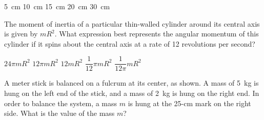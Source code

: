 \documentclass{../../../oss-ap12ibhl}
\begin{document}
\begin{questions}
  \begin{minipage}{.35\linewidth}
  \end{minipage}
  \begin{minipage}{.4\linewidth}  
    \begin{choices}
      \choice\SI{5}{\centi\metre}
      \choice\SI{10}{\centi\metre}
      \choice\SI{15}{\centi\metre}
      \choice\SI{20}{\centi\metre}
      \choice\SI{30}{\centi\metre}
    \end{choices}
  \end{minipage}

  \question The moment of inertia of a particular thin-walled cylinder around
  its central axis is given by $mR^2$. What expression best represents the
  angular momentum of this cylinder if it spins about the central axis at a
  rate of 12 revolutions per second?
  \begin{choices}
    \choice $24\pi mR^2$
    \choice $12\pi mR^2$
    \choice $12mR^2$
    \choice $\dfrac1{12}\pi mR^2$
    \choice $\dfrac1{12\pi}mR^2$
  \end{choices}
    
  \question A meter stick is balanced on a fulcrum at its center, as shown. A
  mass of \SI{5}{\kilo\gram} is hung on the left end of the stick, and a mass of
  \SI{2}{\kilo\gram} is hung on the right end. In order to balance the
  system, a mass $m$ is hung at the 25-cm mark on the right
  side. What is the value of the mass $m$?


\end{questions}
\end{document}
